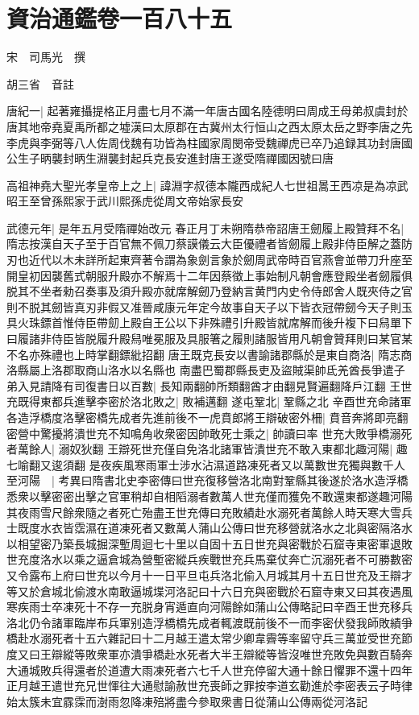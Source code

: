 \section{資治通鑑卷一百八十五}


宋　司馬光　撰

胡三省　音註

唐紀一|{
	起著雍攝提格正月盡七月不滿一年唐古國名陸德明曰周成王母弟叔虞封於唐其地帝堯夏禹所都之墟漢曰太原郡在古冀州太行恒山之西太原太岳之野李唐之先李虎與李弼等八人佐周伐魏有功皆為柱國家周閔帝受魏禪虎已卒乃追録其功封唐國公生子昞襲封昞生淵襲封起兵克長安進封唐王遂受隋禪國因號曰唐}


高祖神堯大聖光孝皇帝上之上|{
	諱淵字叔德本隴西成紀人七世祖暠王西凉是為凉武昭王至曾孫熙家于武川熙孫虎從周文帝始家長安}


武德元年|{
	是年五月受隋禪始改元}
春正月丁未朔隋恭帝詔唐王劒履上殿贊拜不名|{
	隋志按漢自天子至于百官無不佩刀蔡謨儀云大臣優禮者皆劒履上殿非侍臣解之蓋防刃也近代以木未詳所起東齊著令謂為象劍言象於劒周武帝時百官燕會並帶刀升座至開皇初因襲舊式朝服升殿亦不解焉十二年因蔡徵上事始制凡朝會應登殿坐者劒履俱脱其不坐者勑召奏事及須升殿亦就席解劒乃登納言黄門内史令侍郎舍人既夾侍之官則不脱其劒皆真刃非假又准晉咸康元年定今故事自天子以下皆衣冠帶劒今天子則玉具火珠鏢首惟侍臣帶劎上殿自王公以下非殊禮引升殿皆就席解而後升複下曰舄單下曰履諸非侍臣皆脱履升殿舄唯冕服及具服箸之履則諸服皆用凡朝會贊拜則曰某官某不名亦殊禮也上時掌翻鏢紕招翻}
唐王既克長安以書諭諸郡縣於是東自商洛|{
	隋志商洛縣屬上洛郡取商山洛水以名縣也}
南盡巴蜀郡縣長吏及盜賊渠帥氐羌酋長爭遣子弟入見請降有司復書日以百數|{
	長知兩翻帥所類翻酋才由翻見賢遍翻降戶江翻}
王世充既得東都兵進擊李密於洛北敗之|{
	敗補邁翻}
遂屯鞏北|{
	鞏縣之北}
辛酉世充命諸軍各造浮橋度洛擊密橋先成者先進前後不一虎賁郎將王辯破密外柵|{
	賁音奔將即亮翻}
密營中驚擾將潰世充不知鳴角收衆密因帥敢死士乘之|{
	帥讀曰率}
世充大敗爭橋溺死者萬餘人|{
	溺奴狄翻}
王辯死世充僅自免洛北諸軍皆潰世充不敢入東都北趣河陽|{
	趣七喻翻又逡須翻}
是夜疾風寒雨軍士涉水沾濕道路凍死者又以萬數世充獨與數千人至河陽　|{
	考異曰隋書北史李密傳曰世充復移營洛北南對鞏縣其後遂於洛水造浮橋悉衆以擊密密出擊之官軍稍却自相䧟溺者數萬人世充僅而獲免不敢還東都遂趣河陽其夜雨雪尺餘衆隨之者死亡殆盡王世充傳曰充敗績赴水溺死者萬餘人時天寒大雪兵士既度水衣皆霑濕在道凍死者又數萬人蒲山公傳曰世充移營就洛水之北與密隔洛水以相望密乃築長城掘深塹周迴七十里以自固十五日世充與密戰於石窟寺東密軍退敗世充度洛水以乘之逼倉城為營塹密縱兵疾戰世充兵馬棄仗奔亡沉溺死者不可勝數密又令露布上府曰世充以今月十一日平旦屯兵洛北偷入月城其月十五日世充及王辯才等又於倉城北偷渡水南敢逼城堞河洛記曰十六日充與密戰於石窟寺東又曰其夜遇風寒疾雨士卒凍死十不存一充脱身宵遁直向河陽餘如蒲山公傳略記曰辛酉王世充移兵洛北仍令諸軍臨岸布兵軍别造浮橋橋先成者輒渡既前後不一而李密伏發我師敗績爭橋赴水溺死者十五六雜記曰十二月越王遣太常少卿韋霽等率留守兵三萬並受世充節度又曰王辯縱等敗衆軍亦潰爭橋赴水死者大半王辯縱等皆沒唯世充敗免與數百騎奔大通城敗兵得還者於道遭大雨凍死者六七千人世充停留大通十餘日懼罪不還十四年正月越王遣世充兄世惲往大通慰諭赦世充喪師之罪按李道玄勸進於李密表云子時律始太簇未宜霡霂而澍雨忽降凍殕將盡今參取衆書日從蒲山公傳兩從河洛記}
